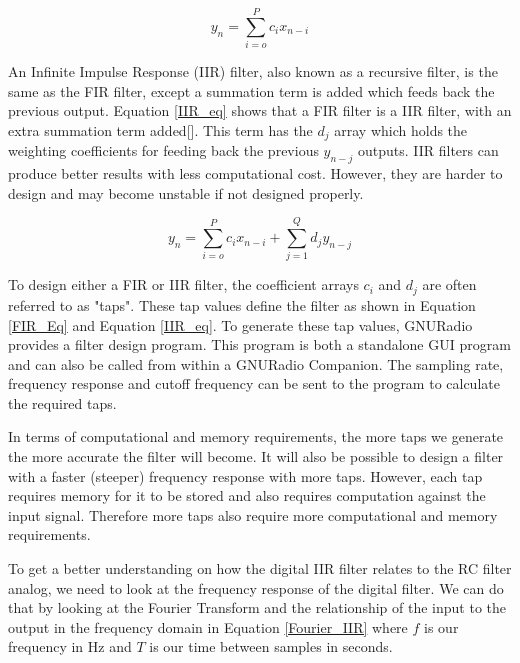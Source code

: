\begin{equation}\label{FIR_Eq}
y_n=\displaystyle\sum\limits_{i=o}^{P} c_ix_{n-i}
\end{equation} 

An Infinite Impulse Response (IIR) filter, also known as a recursive filter, is the same as the FIR filter, except a summation term is added which feeds back the previous output.  Equation \ref{IIR_eq} shows that a FIR filter is a IIR filter, with an extra summation term added[\cite{Cross}]. This term has the $d_j$ array which holds the weighting coefficients for feeding back the previous $y_{n-j}$ outputs.  IIR filters can produce better results with less computational cost.  However, they are harder to design and may become unstable if not designed properly.

\begin{equation}\label{IIR_eq}
y_n=\displaystyle\sum\limits_{i=o}^{P} c_ix_{n-i}+\displaystyle\sum\limits_{j=1}^{Q} d_jy_{n-j}
\end{equation}

To design either a FIR or IIR filter, the coefficient arrays $c_i$ and $d_j$ are often referred to as "taps".  These tap values define the filter as shown in Equation \ref{FIR_Eq} and Equation \ref{IIR_eq}.  To generate these tap values, GNURadio provides a filter design program.  This program is both a standalone GUI program and can also be called from within a GNURadio Companion.  The sampling rate, frequency response and cutoff frequency can be sent to the program to calculate the required taps.  

In terms of computational and memory requirements, the more taps we generate the more accurate the filter will become.  It will also be possible to design a filter with a faster (steeper) frequency response with more taps.  However, each tap requires memory for it to be stored and also requires computation against the input signal.  Therefore more taps also require more computational and memory requirements.  


To get a better understanding on how the digital IIR filter relates to the RC filter analog, we need to look at the frequency response of the digital filter.  We can do that by looking at the Fourier Transform and the relationship of the input to the output in the frequency domain in Equation \ref{Fourier_IIR} where $f$ is our frequency in Hz and $T$ is our time between samples in seconds.  

